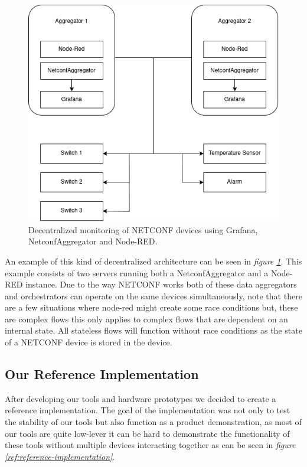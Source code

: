 \documentclass[12pt]{article}
\begin{document}
\newpage

\begin{figure}
  \centering
  \includegraphics[width=\textwidth]{architecture1.png}
  \caption{Decentralized monitoring of NETCONF devices using Grafana, NetconfAggregator and Node-RED.}
  \label{fig:decentralized-monitoring}
\end{figure}

An example of this kind of decentralized architecture can be seen in \textit{figure \ref{fig:decentralized-monitoring}}.
This example consists of two servers running both a NetconfAggregator and a Node-RED instance. Due to the way NETCONF works 
both of these data aggregators and orchestrators can operate on the same devices simultaneously,
note that there are a few situations where node-red might create some race conditions but, these are complex 
flows this only applies to complex flows that are dependent on an internal state. All stateless
flows will function without race conditions as the state of a NETCONF device is stored in the device.

\newpage

\subsection{Our Reference Implementation}
After developing our tools and hardware prototypes we decided to create a reference implementation.
The goal of the implementation was not only to test the stability of our tools but also function as 
a product demonstration, as most of our tools are quite low-lever it can be hard to demonstrate the 
functionality of these tools without multiple devices interacting together as can be seen in 
\textit{figure \ref{ref:reference-implementation}}.
\end{document}
